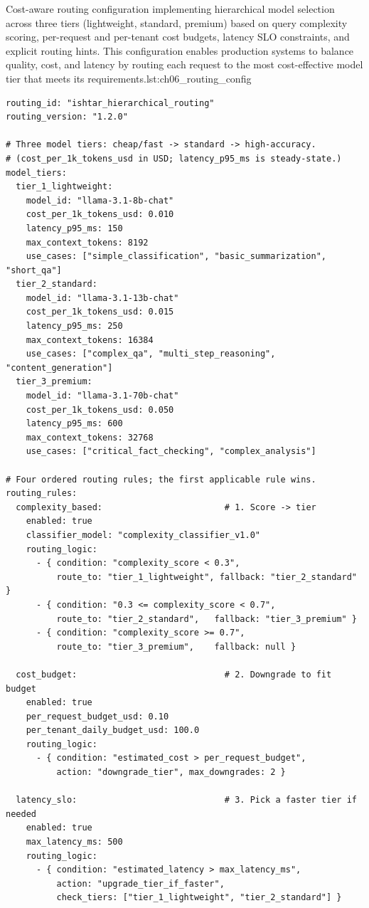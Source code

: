 \begin{codebox}{Cost-aware routing configuration implementing hierarchical model selection across three tiers (lightweight, standard, premium) based on query complexity scoring, per-request and per-tenant cost budgets, latency SLO constraints, and explicit routing hints. This configuration enables production systems to balance quality, cost, and latency by routing each request to the most cost-effective model tier that meets its requirements.}{lst:ch06_routing_config}
\begin{verbatim}
routing_id: "ishtar_hierarchical_routing"
routing_version: "1.2.0"

# Three model tiers: cheap/fast -> standard -> high-accuracy.
# (cost_per_1k_tokens_usd in USD; latency_p95_ms is steady-state.)
model_tiers:
  tier_1_lightweight:
    model_id: "llama-3.1-8b-chat"
    cost_per_1k_tokens_usd: 0.010
    latency_p95_ms: 150
    max_context_tokens: 8192
    use_cases: ["simple_classification", "basic_summarization", "short_qa"]
  tier_2_standard:
    model_id: "llama-3.1-13b-chat"
    cost_per_1k_tokens_usd: 0.015
    latency_p95_ms: 250
    max_context_tokens: 16384
    use_cases: ["complex_qa", "multi_step_reasoning", "content_generation"]
  tier_3_premium:
    model_id: "llama-3.1-70b-chat"
    cost_per_1k_tokens_usd: 0.050
    latency_p95_ms: 600
    max_context_tokens: 32768
    use_cases: ["critical_fact_checking", "complex_analysis"]

# Four ordered routing rules; the first applicable rule wins.
routing_rules:
  complexity_based:                        # 1. Score -> tier
    enabled: true
    classifier_model: "complexity_classifier_v1.0"
    routing_logic:
      - { condition: "complexity_score < 0.3",
          route_to: "tier_1_lightweight", fallback: "tier_2_standard" }
      - { condition: "0.3 <= complexity_score < 0.7",
          route_to: "tier_2_standard",   fallback: "tier_3_premium" }
      - { condition: "complexity_score >= 0.7",
          route_to: "tier_3_premium",    fallback: null }

  cost_budget:                             # 2. Downgrade to fit budget
    enabled: true
    per_request_budget_usd: 0.10
    per_tenant_daily_budget_usd: 100.0
    routing_logic:
      - { condition: "estimated_cost > per_request_budget",
          action: "downgrade_tier", max_downgrades: 2 }

  latency_slo:                             # 3. Pick a faster tier if needed
    enabled: true
    max_latency_ms: 500
    routing_logic:
      - { condition: "estimated_latency > max_latency_ms",
          action: "upgrade_tier_if_faster",
          check_tiers: ["tier_1_lightweight", "tier_2_standard"] }


\end{verbatim}
\end{codebox}
